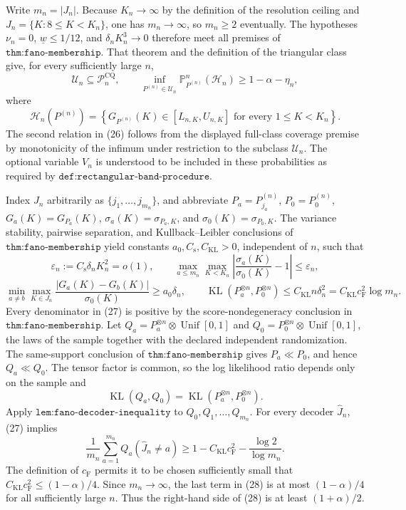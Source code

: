 Write \(m_n=|J_n|\).  Because \(K_n\to\infty\) by the definition of the resolution ceiling and \(J_n=\{K:8\leq K<K_n\}\), one has \(m_n\to\infty\), so \(m_n\geq2\) eventually.  The hypotheses \(\nu_n=0\), \(\underline w\leq1/12\), and \(\delta_nK_n^3\to0\) therefore meet all premises of \(\texttt{thm:fano-membership}\).  That theorem and the definition of the triangular class give, for every sufficiently large \(n\),
\[
 \mathcal U_n\subseteq\mathcal P_n^{\mathrm{CQ}},
 \qquad
 \inf_{P^{(n)}\in\mathcal U_n}\mathbb P_{P^{(n)}}^n(\mathcal H_n)
 \geq1-\alpha-\eta_n,                                      \tag{26}
\]
where
\[
 \mathcal H_n(P^{(n)})=
 \left\{G_{P^{(n)}}(K)\in[L_{n,K},U_{n,K}]
 \text{ for every }1\leq K<K_n\right\}.
\]
The second relation in (26) follows from the displayed full-class coverage premise by monotonicity of the infimum under restriction to the subclass \(\mathcal U_n\).  The optional variable \(V_n\) is understood to be included in these probabilities as required by \(\texttt{def:rectangular-band-procedure}\).

Index \(J_n\) arbitrarily as \(\{j_1,\ldots,j_{m_n}\}\), and abbreviate \(P_a=P_{j_a}^{(n)}\), \(P_0=P_0^{(n)}\), \(G_a(K)=G_{P_a}(K)\), \(\sigma_a(K)=\sigma_{P_a,K}\), and \(\sigma_0(K)=\sigma_{P_0,K}\).  The variance stability, pairwise separation, and Kullback--Leibler conclusions of \(\texttt{thm:fano-membership}\) yield constants \(a_0,C_{\mathrm s},C_{\mathrm{KL}}>0\), independent of \(n\), such that
\[
 \varepsilon_n:=C_{\mathrm s}\delta_nK_n^2=o(1),\qquad
 \max_{a\leq m_n}\max_{K<K_n}
 \left|\frac{\sigma_a(K)}{\sigma_0(K)}-1\right|\leq\varepsilon_n,
\]
\[
 \min_{a\neq b}\max_{K\in J_n}
 \frac{|G_a(K)-G_b(K)|}{\sigma_0(K)}\geq a_0\delta_n,
 \qquad
 \operatorname{KL}(P_a^{\otimes n},P_0^{\otimes n})
 \leq C_{\mathrm{KL}}n\delta_n^2
 =C_{\mathrm{KL}}c_{\mathrm F}^2\log m_n.                    \tag{27}
\]
Every denominator in (27) is positive by the score-nondegeneracy conclusion in \(\texttt{thm:fano-membership}\).  Let \(Q_a=P_a^{\otimes n}\otimes\operatorname{Unif}[0,1]\) and \(Q_0=P_0^{\otimes n}\otimes\operatorname{Unif}[0,1]\), the laws of the sample together with the declared independent randomization.  The same-support conclusion of \(\texttt{thm:fano-membership}\) gives \(P_a\ll P_0\), and hence \(Q_a\ll Q_0\).  The tensor factor is common, so the log likelihood ratio depends only on the sample and
\[
 \operatorname{KL}(Q_a,Q_0)=\operatorname{KL}(P_a^{\otimes n},P_0^{\otimes n}).
\]
Apply \(\texttt{lem:fano-decoder-inequality}\) to \(Q_0,Q_1,\ldots,Q_{m_n}\).  For every decoder \(\widehat J_n\), (27) implies
\[
 \frac1{m_n}\sum_{a=1}^{m_n}Q_a(\widehat J_n\neq a)
 \geq1-C_{\mathrm{KL}}c_{\mathrm F}^2-\frac{\log2}{\log m_n}. \tag{28}
\]
The definition of \(c_{\mathrm F}\) permits it to be chosen sufficiently small that \(C_{\mathrm{KL}}c_{\mathrm F}^2\leq(1-\alpha)/4\).  Since \(m_n\to\infty\), the last term in (28) is at most \((1-\alpha)/4\) for all sufficiently large \(n\).  Thus the right-hand side of (28) is at least \((1+\alpha)/2\).

